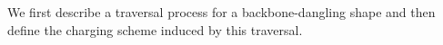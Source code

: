 \documentclass[12pt]{article}
\begin{document}
We first describe a traversal process for a backbone-dangling shape and then define the charging scheme induced by this traversal.


%
%
\end{document}
